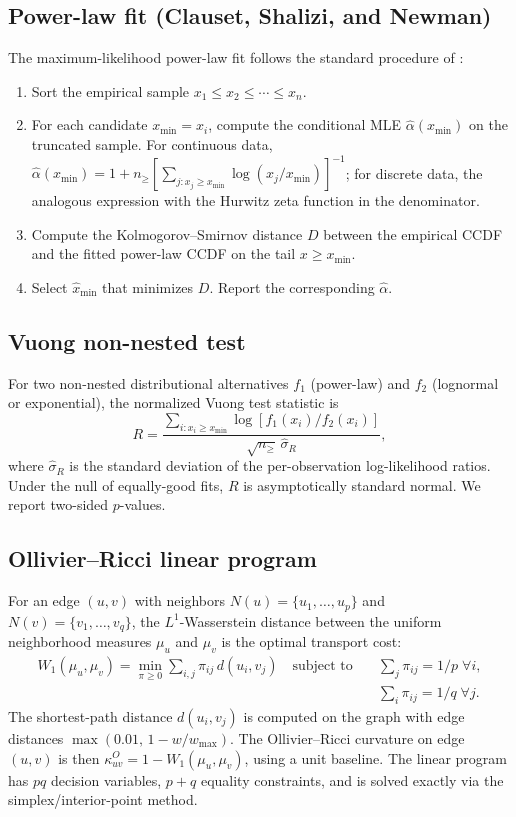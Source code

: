 \documentclass[11pt,a4paper]{article}
\begin{document}
\subsection{Power-law fit (Clauset, Shalizi, and Newman)}
The maximum-likelihood power-law fit follows the standard procedure of
\citet{Clauset2009}:
\begin{enumerate}
\item Sort the empirical sample $x_1\leq x_2\leq\cdots\leq x_n$.
\item For each candidate $x_{\min}=x_i$, compute the conditional MLE
$\hat{\alpha}(x_{\min})$ on the truncated sample. For continuous data,
$\hat{\alpha}(x_{\min}) = 1 + n_{\geq}\left[\sum_{j: x_j\geq x_{\min}} \log(x_j/x_{\min})\right]^{-1}$;
for discrete data, the analogous expression with the Hurwitz zeta function
in the denominator.
\item Compute the Kolmogorov--Smirnov distance $D$ between the empirical
CCDF and the fitted power-law CCDF on the tail $x\geq x_{\min}$.
\item Select $\hat{x}_{\min}$ that minimizes $D$. Report the corresponding
$\hat{\alpha}$.
\end{enumerate}

\subsection{Vuong non-nested test}
For two non-nested distributional alternatives $f_1$ (power-law) and $f_2$
(lognormal or exponential), the normalized Vuong test statistic is
\[
R = \frac{\sum_{i: x_i\geq x_{\min}} \log\!\left[f_1(x_i)/f_2(x_i)\right]}
{\sqrt{n_{\geq}}\,\hat{\sigma}_R},
\]
where $\hat{\sigma}_R$ is the standard deviation of the per-observation
log-likelihood ratios. Under the null of equally-good fits, $R$ is
asymptotically standard normal. We report two-sided $p$-values.

\subsection{Ollivier--Ricci linear program}
For an edge $(u,v)$ with neighbors $N(u)=\{u_1,\dots,u_p\}$ and
$N(v)=\{v_1,\dots,v_q\}$, the $L^1$-Wasserstein distance between the uniform
neighborhood measures $\mu_u$ and $\mu_v$ is the optimal transport cost:
\begin{align*}
W_1(\mu_u,\mu_v) = \min_{\pi\geq 0} \sum_{i,j} \pi_{ij}\,d(u_i,v_j) \quad
\text{subject to} \quad
& \sum_j \pi_{ij} = 1/p \;\forall i,\\
& \sum_i \pi_{ij} = 1/q \;\forall j.
\end{align*}
The shortest-path distance $d(u_i,v_j)$ is computed on the graph with edge
distances $\max(0.01,\,1-w/w_{\max})$. The Ollivier--Ricci curvature on edge
$(u,v)$ is then $\kappa^O_{uv} = 1 - W_1(\mu_u,\mu_v)$, using a unit
baseline. The linear program has $pq$ decision variables, $p+q$
equality constraints, and is solved exactly via the simplex/interior-point
method.


\end{document}

